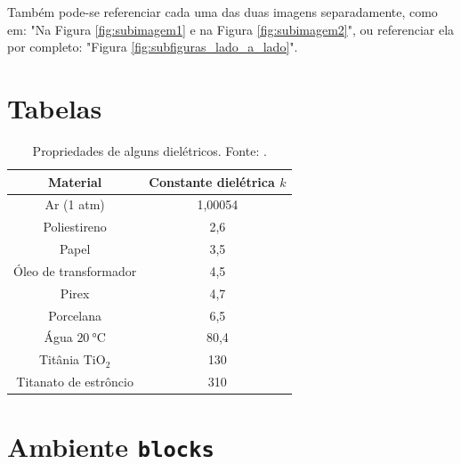 Também pode-se referenciar cada uma das duas imagens separadamente, como em: "Na Figura \ref{fig:subimagem1} e na Figura \ref{fig:subimagem2}", ou referenciar ela por completo: "Figura \ref{fig:subfiguras_lado_a_lado}".




\section{Tabelas}


\begin{table}[H]
    \centering
    
    \begin{tabular}{cc}
        \toprule
        \textbf{Material}               & \textbf{Constante dielétrica \( k \)} \\
        \midrule
        Ar (1 atm)                      & 1,00054   \\
        Poliestireno                    & 2,6       \\
        Papel                           & 3,5       \\
        Óleo de transformador           & 4,5       \\
        Pirex                           & 4,7       \\
        Porcelana                       & 6,5       \\
        Água \( \SI{20}{\celsius} \)    & 80,4      \\
        Titânia \( \mathrm{TiO_2} \)    & 130       \\
        Titanato de estrôncio           & 310       \\
        \bottomrule
    \end{tabular}
    
    \caption{Propriedades de alguns dielétricos. Fonte: \cite{halliday}.}
    \label{tab:dieletricos}
\end{table}






\section{Ambiente \texttt{blocks}}


